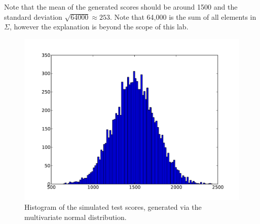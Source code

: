 Note that the mean of the generated scores should be around 1500 and the standard deviation $\sqrt{64000} \approx 253$. 
Note that 64,000 is the sum of all elements in $\Sigma$, however the explanation is beyond the scope of this lab. 

\begin{figure}[h]
\centering
\includegraphics[width=\textwidth]{scorehist-mvn.pdf}
\caption{Histogram of the simulated test scores, generated via the multivariate normal distribution.}
\end{figure}

